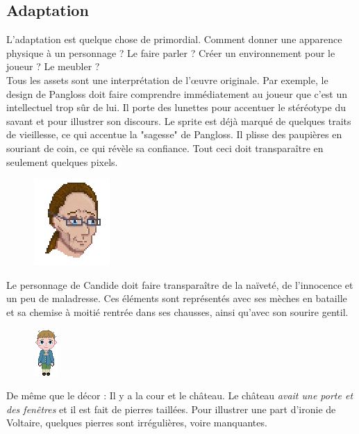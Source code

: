 \documentclass[11pt]{article}
\begin{document}
\subsection{Adaptation}
L'adaptation est quelque chose de primordial. Comment donner une apparence physique à un personnage ? Le faire parler ? Créer un environnement pour le joueur ? Le meubler ?\\ 
Tous les assets sont une interprétation de l'œuvre originale. Par exemple, le design de Pangloss doit faire comprendre immédiatement au joueur que c'est un intellectuel trop sûr de lui. Il porte des lunettes pour accentuer le stéréotype du savant et pour illustrer son discours. Le sprite est déjà marqué de quelques traits de vieillesse, ce qui accentue la "sagesse" de Pangloss. Il plisse des paupières en souriant de coin, ce qui révèle sa confiance. Tout ceci doit transparaître en seulement quelques pixels.
\begin{figure}[H]
\includegraphics[scale=0.8]{panglossHead}
\centering
\end{figure}
Le personnage de Candide doit faire transparaître de la naïveté, de l'innocence et un peu de maladresse. Ces éléments sont représentés avec ses mèches en bataille et sa chemise à moitié rentrée dans ses chausses, ainsi qu'avec son sourire gentil.\\
\begin{figure}[H]
\includegraphics[scale=1.3]{candide}
\centering
\end{figure}
De même que le décor : Il y a la cour et le château. Le château \textit{avait une porte et des fenêtres} et il est fait de pierres taillées. Pour illustrer une part d'ironie de Voltaire, quelques pierres sont irrégulières, voire manquantes.
\end{document}
